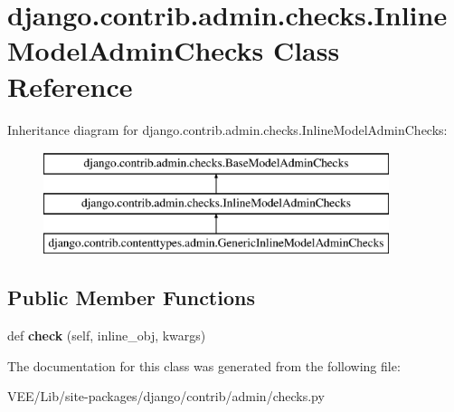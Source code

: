 \hypertarget{classdjango_1_1contrib_1_1admin_1_1checks_1_1_inline_model_admin_checks}{}\section{django.\+contrib.\+admin.\+checks.\+Inline\+Model\+Admin\+Checks Class Reference}
\label{classdjango_1_1contrib_1_1admin_1_1checks_1_1_inline_model_admin_checks}
Inheritance diagram for django.\+contrib.\+admin.\+checks.\+Inline\+Model\+Admin\+Checks\+:\begin{figure}[H]
\begin{center}
\leavevmode
\includegraphics[height=3.000000cm]{classdjango_1_1contrib_1_1admin_1_1checks_1_1_inline_model_admin_checks}
\end{center}
\end{figure}
\subsection*{Public Member Functions}
\begin{DoxyCompactItemize}
\item 
\mbox{\label{classdjango_1_1contrib_1_1admin_1_1checks_1_1_inline_model_admin_checks_a09090277355ffade10dd7d2b89673db0}} 
def {\bfseries check} (self, inline\+\_\+obj, kwargs)
\end{DoxyCompactItemize}


The documentation for this class was generated from the following file\+:\begin{DoxyCompactItemize}
\item 
V\+E\+E/\+Lib/site-\/packages/django/contrib/admin/checks.\+py\end{DoxyCompactItemize}
